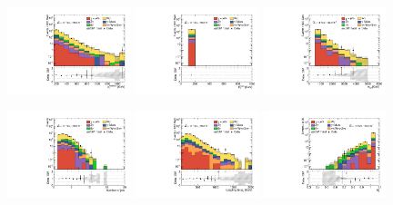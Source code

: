 \begin{figure}[ht!]
  \begin{center}

    \includegraphics[width=0.32\textwidth]{images_tmp/results/fr2/can_CRW_ph_pt0_afterFit.pdf}
    \includegraphics[width=0.32\textwidth]{images_tmp/results/fr2/can_CRW_met_et_afterFit.pdf}
    \includegraphics[width=0.32\textwidth]{images_tmp/results/fr2/can_CRW_meff_afterFit.pdf}

    \includegraphics[width=0.32\textwidth]{images_tmp/results/fr2/can_CRW_jet_n_afterFit}
    \includegraphics[width=0.32\textwidth]{images_tmp/results/fr2/can_CRW_jet_pt0_afterFit.pdf}
    \includegraphics[width=0.32\textwidth]{images_tmp/results/fr2/can_CRW_rt4_afterFit}


\end{center}
\end{figure}
